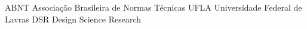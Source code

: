 {ABNT} %
{Associação Brasileira de Normas Técnicas} %
{UFLA} %
{Universidade Federal de Lavras} %
{DSR}
{Design Science Research}